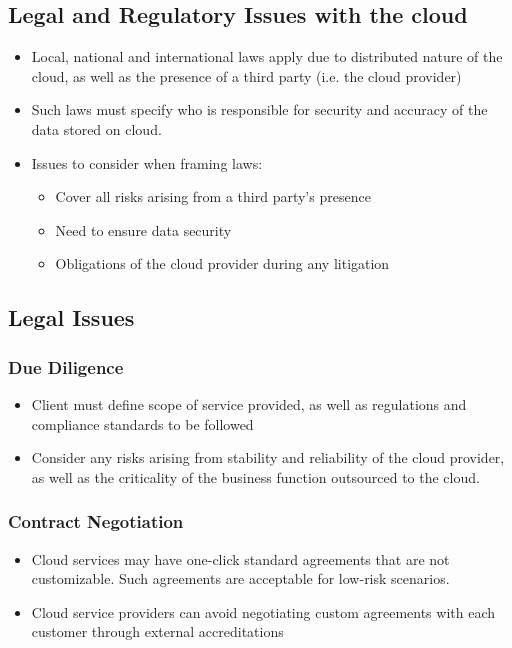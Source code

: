 \documentclass{article}
\begin{document}
\subsection{Legal and Regulatory Issues with the cloud}
\begin{itemize}
    \item Local, national and international laws apply due to distributed nature of the cloud, as well as the presence of a third party (i.e. the cloud provider)
    
    \item Such laws must specify who is responsible for security and accuracy of the data stored on cloud. 
    
    \item Issues to consider when framing laws:
    \begin{itemize}
        \item Cover all risks arising from a third party's presence 
        
        \item Need to ensure data security 
        
        \item Obligations of the cloud provider during any litigation
    \end{itemize}
\end{itemize}
\subsection{Legal Issues}
\subsubsection{Due Diligence}
\begin{itemize}
    \item Client must define scope of service provided, as well as regulations and compliance standards to be followed
    
    \item Consider any risks arising from stability and reliability of the cloud provider, as well as the criticality of the business function outsourced to the cloud.
\end{itemize}

\subsubsection{Contract Negotiation}
\begin{itemize}
    \item Cloud services may have one-click standard agreements that are not customizable. Such agreements are acceptable for low-risk scenarios.
    
    \item Cloud service providers can avoid negotiating custom agreements with each customer through external accreditations
\end{itemize}
\end{document}
